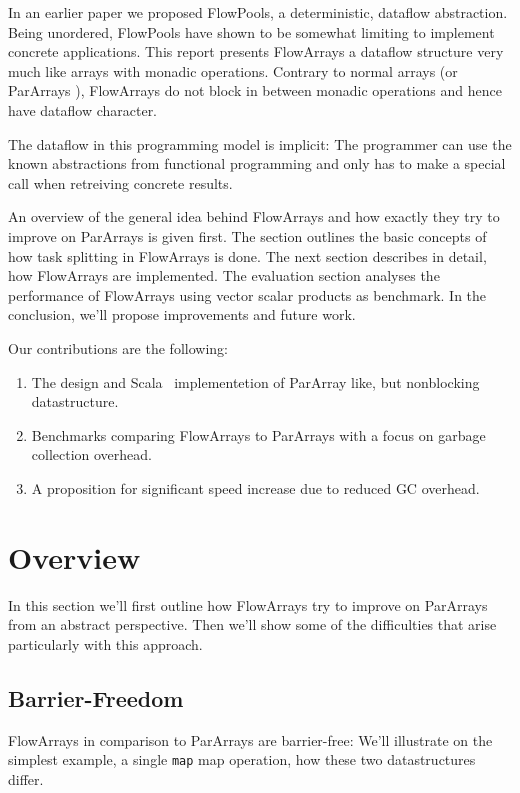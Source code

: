 \documentclass[runningheads,a4paper,fleqn]{llncs}
\begin{document}
In an earlier paper \cite{FP12} we proposed FlowPools, a
deterministic, dataflow abstraction. Being unordered, FlowPools have
shown to be somewhat limiting to implement concrete applications. This
report presents FlowArrays a dataflow structure very much like arrays
with monadic operations. Contrary to normal arrays (or ParArrays
\cite{collect11}), FlowArrays do not block in between monadic
operations and hence have dataflow character.

The dataflow in this programming model is implicit: The programmer can
use the known abstractions from functional programming and only has to
make a special call when retreiving concrete results.

An overview of the general idea behind FlowArrays and how exactly they
try to improve on ParArrays is given first. The section outlines the
basic concepts of how task splitting in FlowArrays is done. The next
section describes in detail, how FlowArrays are implemented. The
evaluation section analyses the performance of FlowArrays using vector
scalar products as benchmark. In the conclusion, we'll propose
improvements and future work.

Our contributions are the following:
\begin{enumerate}
\item The design and Scala~\cite{Odersky10} implementetion of ParArray
  like, but nonblocking datastructure.
\item Benchmarks comparing FlowArrays to ParArrays with a focus on
  garbage collection overhead.
\item A proposition for significant speed increase due to reduced GC
  overhead.
\end{enumerate}

\section{Overview}
\label{sec:overview}

In this section we'll first outline how FlowArrays try to improve on
ParArrays from an abstract perspective. Then we'll show some of the
difficulties that arise particularly with this approach.

\subsection{Barrier-Freedom}
FlowArrays in comparison to ParArrays are barrier-free: We'll
illustrate on the simplest example, a single \texttt{map} map
operation, how these two datastructures differ.
\end{document}
